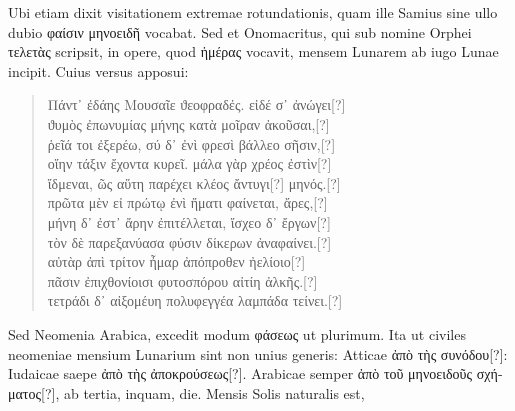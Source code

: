 Ubi etiam dixit visitationem
extremae rotundationis, quam ille Samius sine ullo dubio
 \textgreek{φαίσιν μηνοειδῆ} vocabat.
Sed et Onomacritus, qui sub nomine Orphei
 \textgreek{τελετὰς}
scripsit, in opere, quod
 \textgreek{ἡμέρας}
 vocavit, mensem Lunarem ab iugo Lunae
incipit.
Cuius versus apposui:
\begin{verse}
\begin{greek}
Πάντ᾽ ἐδάης Μουσαῖε ϑεοφραδἐς. εἰδέ σ᾽ ἀνώγει[?]\\
ϑυμὸς ἐπωνυμίας μήνης κατὰ μοῖραν ἀκοῦσαι,[?]\\
ῥεῖά τοι ἐξερέω, σύ δ᾽ ἐνὶ φρεσὶ βάλλεο σῆσιν,[?]\\
οἵην τάξιν ἔχοντα κυρεῖ. μάλα γὰρ χρέος ἐστὶν[?]\\
ἴδμεναι, ῶς αὕτη παρέχει κλέος ἄντυγι[?] μηνός.[?]\\
πρῶτα μὲν εἰ πρώτῳ ἐνὶ ἤματι φαίνεται, ἄρες,[?]\\
μήνη δ᾽ ἐστ᾽ ἄρην ἐπιτέλλεται, ἴσχεο δ᾽ ἔργων[?]\\
τὸν δὲ παρεξανύασα φύσιν δίκερων ἀναφαίνει.[?]\\
αὐτὰρ ἀπὶ τρίτον ἦμαρ ἀπόπροθεν ἠελίοιο[?]\\
πᾶσιν ἐπιχθονίοισι φυτοσπόρου αἰτίη ἀλκῆς.[?]\\
τετράδι δ᾽ αἰξομέυη πολυφεγγέα λαμπάδα τείνει.[?]
\end{greek}
\end{verse}
Sed Neomenia Arabica, excedit modum
 \textgreek{φάσεως} ut plurimum.
Ita ut
civiles neomeniae mensium Lunarium sint non unius generis: Atticae
\textgreek{ἀπὸ τὴς συνόδου[?]}: Iudaicae saepe
 \textgreek{ἀπὸ τὴς ἀποκρούσεως[?]}.
Arabicae semper \textgreek{ἀπὸ τοῦ
μηνοειδοῦς σχήματος[?]},
ab tertia, inquam, die.
Mensis Solis naturalis est,
